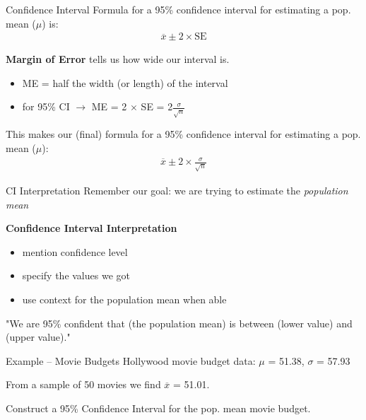 \documentclass{beamer}
\begin{document}
\begin{frame}{Confidence Interval}
Formula for a 95\% confidence interval for estimating a pop. mean ($\mu$) is:
\begin{align*}
\overline{x} \pm 2 \times \text{SE}
\end{align*} \vspace{2mm}


\textbf{Margin of Error} tells us how wide our interval is.
\begin{itemize}
    \item ME = half the width (or length) of the interval
    \item for 95\% CI $\rightarrow$ ME = 2
    $\times$ SE = 2$\frac{\sigma}{\sqrt{n}}$
\end{itemize} \vspace{8mm}

This makes our (final) formula for a 95\% confidence interval for estimating a pop. mean ($\mu$):
\begin{align*}
\overline{x} \pm 2 \times \frac{\sigma}{\sqrt{n}}
\end{align*} \vspace{4mm}
\end{frame}

\begin{frame}{CI Interpretation}
Remember our goal: we are trying to estimate the \textit{population mean} \vspace{6mm}

\textbf{Confidence Interval Interpretation}
\begin{itemize}
    \item mention confidence level
    \item specify the values we got
    \item use context for the population mean when able
\end{itemize} \vspace{6mm}

"We are 95\% confident that (the population mean) is between (lower value) and (upper value)."
\end{frame}

\begin{frame}{Example -- Movie Budgets}
Hollywood movie budget data: $\mu$ = 51.38, $\sigma$ = 57.93 \vspace{2mm}

From a sample of 50 movies we find $\overline{x}$ = 51.01. \vspace{2mm} 

Construct a 95\% Confidence Interval for the pop. mean movie budget. 
\vspace{30mm}
\end{frame}
\end{document}
